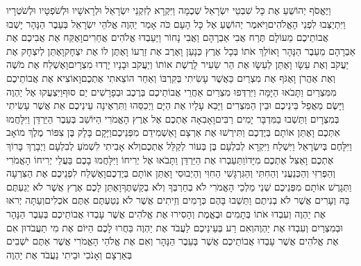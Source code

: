 \documentclass[../main/main.tex]{subfiles}
\begin{document}
\begin{multicols*}{\ncols}
וַיֶּאֱסֹף יְהוֹשֻׁעַ אֶת כָּל שִׁבְטֵי יִשְׂרָאֵל שְׁכֶמָה וַיִּקְרָא לְזִקְנֵי יִשְׂרָאֵל וּלְרָאשָׁיו וּלְשֹׁפְטָיו וּלְשֹׁטְרָיו וַיִּתְיַצְּבוּ לִפְנֵי הָאֱלֹהִים\PreVerseSpace{}וַיֹּאמֶר יְהוֹשֻׁעַ אֶל כָּל הָעָם כֹּה אָמַר יַהְוֶה אֱלֹהֵי יִשְׂרָאֵל בְּעֵבֶר הַנָּהָר יָשְׁבוּ אֲבוֹתֵיכֶם מֵעוֹלָם תֶּרַח אֲבִי אַבְרָהָם וַאֲבִי נָחוֹר וַיַּעַבְדוּ אֱלֹהִים אֲחֵרִים\PreVerseSpace{}וָאֶקַּח אֶת אֲבִיכֶם אֶת אַבְרָהָם מֵעֵבֶר הַנָּהָר וָאוֹלֵךְ אֹתוֹ בְּכָל אֶרֶץ כְּנָעַן וָאֶרֶב אֶת זַרְעוֹ וָאֶתֶּן לוֹ אֶת יִצְחָק\PreVerseSpace{}וָאֶתֵּן לְיִצְחָק אֶת יַעֲקֹב וְאֶת עֵשָׂו וָאֶתֵּן לְעֵשָׂו אֶת הַר שֵׂעִיר לָרֶשֶׁת אוֹתוֹ וְיַעֲקֹב וּבָנָיו יָרְדוּ מִצְרָיִם\PreVerseSpace{}וָאֶשְׁלַח אֶת מֹשֶׁה וְאֶת אַהֲרֹן וָאֶגֹּף אֶת מִצְרַיִם כַּאֲשֶׁר עָשִׂיתִי בְּקִרְבּוֹ וְאַחַר הוֹצֵאתִי אֶתְכֶם\PreVerseSpace{}וָאוֹצִיא אֶת אֲבוֹתֵיכֶם מִמִּצְרַיִם וַתָּבֹאוּ הַיָּמָּה וַיִּרְדְּפוּ מִצְרַיִם אַחֲרֵי אֲבוֹתֵיכֶם בְּרֶכֶב וּבְפָרָשִׁים יַם סוּף\PreVerseSpace{}וַיִּצְעֲקוּ אֶל יַהְוֶה וַיָּשֶׂם מַאֲפֵל בֵּינֵיכֶם וּבֵין הַמִּצְרִים וַיָּבֵא עָלָיו אֶת הַיָּם וַיְכַסֵּהוּ וַתִּרְאֶינָה עֵינֵיכֶם אֵת אֲשֶׁר עָשִׂיתִי בְּמִצְרָיִם וַתֵּשְׁבוּ בַמִּדְבָּר יָמִים רַבִּים\PreVerseSpace{}וָאָבִאָה אֶתְכֶם אֶל אֶרֶץ הָאֱמֹרִי הַיּוֹשֵׁב בְּעֵבֶר הַיַּרְדֵּן וַיִּלָּחֲמוּ אִתְּכֶם וָאֶתֵּן אוֹתָם בְּיֶדְכֶם וַתִּירְשׁוּ אֶת אַרְצָם וָאַשְׁמִידֵם מִפְּנֵיכֶם\PreVerseSpace{}וַיָּקָם בָּלָק בֶּן צִפּוֹר מֶלֶךְ מוֹאָב וַיִּלָּחֶם בְּיִשְׂרָאֵל וַיִּשְׁלַח וַיִּקְרָא לְבִלְעָם בֶּן בְּעוֹר לְקַלֵּל אֶתְכֶם\PreVerseSpace{}וְלֹא אָבִיתִי לִשְׁמֹעַ לְבִלְעָם וַיְבָרֶךְ בָּרוֹךְ אֶתְכֶם וָאַצִּל אֶתְכֶם מִיָּדוֹ\PreVerseSpace{}וַתַּעַבְרוּ אֶת הַיַּרְדֵּן וַתָּבֹאוּ אֶל יְרִיחוֹ וַיִּלָּחֲמוּ בָכֶם בַּעֲלֵי יְרִיחוֹ הָאֱמֹרִי וְהַפְּרִזִּי וְהַכְּנַעֲנִי וְהַחִתִּי וְהַגִּרְגָּשִׁי הַחִוִּי וְהַיְבוּסִי וָאֶתֵּן אוֹתָם בְּיֶדְכֶם\PreVerseSpace{}וָאֶשְׁלַח לִפְנֵיכֶם אֶת הַצִּרְעָה וַתְּגָרֶשׁ אוֹתָם מִפְּנֵיכֶם שְׁנֵי מַלְכֵי הָאֱמֹרִי לֹא בְחַרְבְּךָ וְלֹא בְקַשְׁתֶּךָ\PreVerseSpace{}וָאֶתֵּן לָכֶם אֶרֶץ אֲשֶׁר לֹא יְגַעְתֶּם\SubEnd{} בָּהּ וְעָרִים אֲשֶׁר לֹא בְנִיתֶם וַתֵּשְׁבוּ בָּהֶם כְּרָמִים וְזֵיתִים אֲשֶׁר לֹא נְטַעְתֶּם אַתֶּם אֹכְלִים\PreVerseSpace{}וְעַתָּה יְראוּ אֶת יַהְוֶה וְעִבְדוּ אֹתוֹ בְּתָמִים וּבֶאֱמֶת וְהָסִירוּ אֶת אֱלֹהִים אֲשֶׁר עָבְדוּ אֲבוֹתֵיכֶם בְּעֵבֶר הַנָּהָר וּבְמִצְרַיִם וְעִבְדוּ אֶת יַהְוֶה\PreVerseSpace{}וְאִם רַע בְּעֵינֵיכֶם לַעֲבֹד אֶת יַהְוֶה בַּחֲרוּ לָכֶם הַיּוֹם אֶת מִי תַעֲבֹדוּן אִם אֶת אֱלֹהִים אֲשֶׁר עָבְדוּ אֲבוֹתֵיכֶם אֲשֶׁר בְּעֵבֶר הַנָּהָר וְאִם אֶת אֱלֹהֵי הָאֱמֹרִי אֲשֶׁר אַתֶּם יֹשְׁבִים בְּאַרְצָם וְאָנֹכִי וּבֵיתִי נַעֲבֹד אֶת יַהְוֶה\OpenSection{}\par

\end{multicols*}
\end{document}

